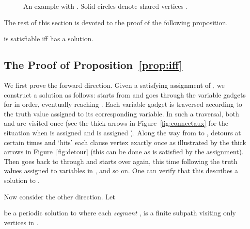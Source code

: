 \documentclass[envcountsame]{llncs}
\begin{document}
\begin{figure}[h]
\caption{An example with . Solid circles denote shared vertices .}
\label{fig:stack}
\end{figure}

The rest of this section is devoted to the proof of the following proposition.
\begin{proposition}\label{prop:iff}
 is satisfiable iff  has a solution.
\end{proposition}
\subsection{The Proof of Proposition~\ref{prop:iff}}

We first prove the forward direction. Given a satisfying assignment of
, we construct a solution  as follows:  starts from 
and goes through the variable gadgets for  in order,
eventually reaching . Each variable gadget is traversed according to the
truth value assigned to its corresponding variable. In such a traversal,
both  and  are visited once
(see the thick arrows in Figure~\ref{fig:connectaux} for the situation when  is assigned 
and  is assigned ).
Along the way from  to ,  detours at certain times and `hits' each clause vertex
exactly once as illustrated by the thick arrows in Figure~\ref{fig:detour}
(this can be done as  is satisfied by the assignment).
Then  goes back to  through  and starts over again, this time following 
the truth values assigned to variables in , and so on.
One can verify that this describes a solution to .

Now consider the other direction. Let 

be a periodic solution to  where each \emph{segment} ,  is a
finite subpath visiting only vertices in .
\end{document}
